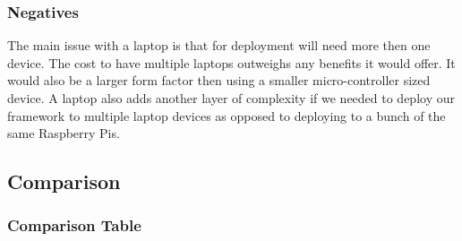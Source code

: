 \subsubsection{Negatives}
The main issue with a laptop is that for deployment will need more then one device. The cost to have multiple laptops outweighs any benefits it would offer. It would also be a larger form factor then using a smaller micro-controller sized device. A laptop also adds another layer of complexity if we needed to deploy our framework to multiple laptop devices as opposed to deploying to a bunch of the same Raspberry Pis.

\subsection{Comparison}
\subsubsection{Comparison Table}
\FloatBarrier
\begin{table}[H]
\fontsize{3}{4}\selectfont
\centering
\def\arraystretch{1.2}
\newline\newline 
\end{table}

